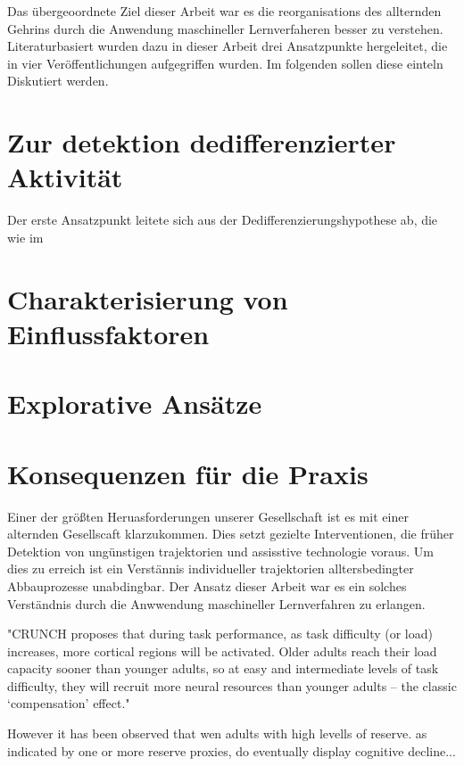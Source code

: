 Das übergeoordnete Ziel dieser Arbeit war es die reorganisations des allternden Gehrins durch die Anwendung maschineller Lernverfaheren besser zu verstehen. Literaturbasiert wurden dazu in dieser Arbeit drei Ansatzpunkte hergeleitet, die in vier Veröffentlichungen aufgegriffen wurden. Im folgenden sollen diese einteln Diskutiert werden. 

\section{Zur detektion dedifferenzierter Aktivität}
Der erste Ansatzpunkt leitete sich aus der Dedifferenzierungshypothese ab, die wie im 


\section{Charakterisierung von Einflussfaktoren}


\section{Explorative Ansätze}

\section{Konsequenzen für die Praxis}
Einer der größten Heruasforderungen unserer Gesellschaft ist es mit einer alternden Gesellscaft klarzukommen. Dies setzt gezielte Interventionen, die früher Detektion von ungünstigen trajektorien und assisstive technologie voraus. Um dies zu erreich ist ein Verstännis individueller trajektorien alltersbedingter Abbauprozesse unabdingbar. Der Ansatz dieser Arbeit war es ein solches Verständnis durch die Anwwendung maschineller Lernverfahren zu erlangen. 
 

"CRUNCH proposes that during task performance, as task difficulty (or load) increases, more cortical regions will be activated. Older adults reach their load capacity sooner than younger adults, so at easy and intermediate levels of task difficulty, they will recruit more neural resources than younger adults – the classic ‘compensation’ effect."


However it has been observed that wen adults with high levells of reserve. as indicated by one or more reserve proxies, do eventually display cognitive decline...